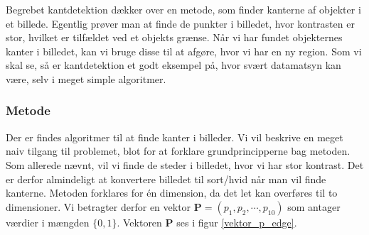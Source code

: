 {
Begrebet kantdetektion dækker over en metode, som finder kanterne af
objekter i et billede. Egentlig prøver man at finde de punkter i
billedet, hvor kontrasten er stor, hvilket er tilfældet ved et objekts
grænse. Når vi har fundet objekternes kanter i billedet, kan vi bruge
disse til at afgøre, hvor vi har en ny region.  Som vi skal se, så er
kantdetektion et godt eksempel på, hvor svært datamatsyn kan være, selv
i meget simple algoritmer.

\subsubsection*{Metode}
Der er findes algoritmer til at finde kanter i
billeder\cite{SIOlsen}. Vi vil beskrive en meget naiv tilgang til
problemet, blot for at forklare grundprincipperne bag metoden. Som
allerede nævnt, vil vi finde de steder i billedet, hvor vi har stor
kontrast. Det er derfor almindeligt at konvertere billedet til sort/hvid
når man vil finde kanterne. Metoden forklares for én dimension, da det
let kan overføres til to dimensioner. Vi betragter derfor en vektor
$\mathbf{P} = (p_1, p_2, \cdots, p_{10})$ som antager værdier i mængden
$\{0,1\}$. Vektoren $\mathbf{P}$ ses i figur \ref{vektor_p_edge}.

}
